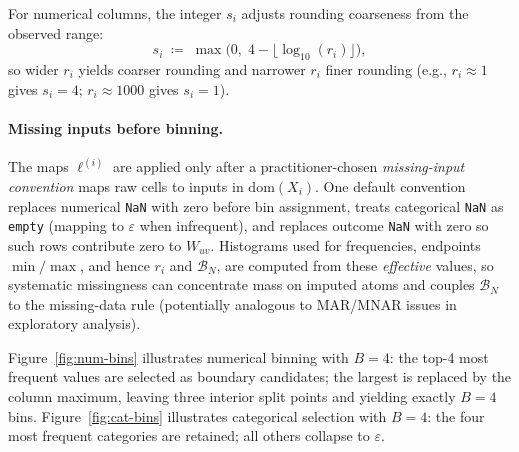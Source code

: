 \documentclass[11pt]{article}
\begin{document}
For numerical columns, the integer $s_i$ adjusts rounding coarseness from the observed range:
\begin{equation}
\label{eq:si-rounding}
  s_i \;\coloneqq\; \max\!\bigl(0,\; 4 - \lfloor \log_{10}(r_i) \rfloor\bigr),
\end{equation}
so wider $r_i$ yields coarser rounding and narrower $r_i$ finer rounding (e.g., $r_i \approx 1$ gives $s_i = 4$; $r_i \approx 1000$ gives $s_i = 1$).

\paragraph{Missing inputs before binning.}
The maps $\ell^{(i)}$ are applied only after a practitioner-chosen \emph{missing-input convention} maps raw cells to inputs in $\mathrm{dom}(X_i)$.
One default convention replaces numerical \texttt{NaN} with zero before bin assignment, treats categorical \texttt{NaN} as \texttt{empty} (mapping to $\varepsilon$ when infrequent), and replaces outcome \texttt{NaN} with zero so such rows contribute zero to $W_{uv}$.
Histograms used for frequencies, endpoints $\min/\max$, and hence $r_i$ and $\mathcal{B}_N$, are computed from these \emph{effective} values, so systematic missingness can concentrate mass on imputed atoms and couples $\mathcal{B}_N$ to the missing-data rule (potentially analogous to MAR/MNAR issues in exploratory analysis).

Figure~\ref{fig:num-bins} illustrates numerical binning with $B=4$: the top-4 most frequent values are selected as boundary candidates; the largest is replaced by the column maximum, leaving three interior split points and yielding exactly $B=4$ bins.
Figure~\ref{fig:cat-bins} illustrates categorical selection with $B=4$: the four most frequent categories are retained; all others collapse to $\varepsilon$.
\end{document}
